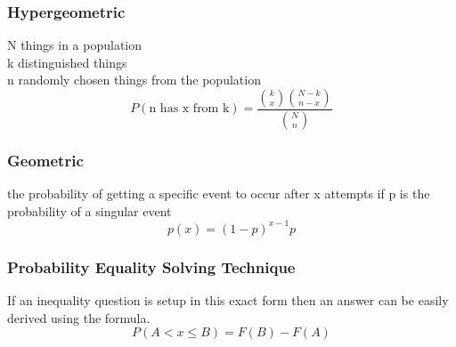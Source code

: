 \documentclass[landscape, 12pt]{report}
\begin{document}
\begin{multicols*}{3}
\subsubsection*{Hypergeometric}
N things in a population\\
k distinguished things\\
n randomly chosen things from the population\\
\begin{equation}
    P(\text{n has x from k}) = \frac{{k\choose x}{N-k\choose n-x}}{{N\choose n}}
\end{equation}
\subsubsection*{Geometric}
the probability of getting a specific event to  occur after x attempts if p is the probability of a singular event
\begin{equation}
    p(x) = (1-p)^{x-1}p
\end{equation}
\subsubsection*{Probability Equality Solving Technique}
If an inequality question is setup in this exact form then an answer can be easily derived using the formula.
\begin{equation}
    P(A < x \leq B) = F(B) - F(A)
\end{equation}
\end{multicols*}
\end{document}
